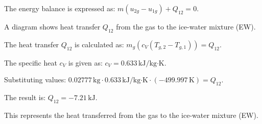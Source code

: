 The energy balance is expressed as:  
\( m (u_{2g} - u_{1g}) + Q_{12} = 0 \).  

A diagram shows heat transfer \( Q_{12} \) from the gas to the ice-water mixture (EW).  

The heat transfer \( Q_{12} \) is calculated as:  
\( m_g (c_V (T_{g,2} - T_{g,1})) = Q_{12} \).  

The specific heat \( c_V \) is given as:  
\( c_V = 0.633 \, \text{kJ/kg·K} \).  

Substituting values:  
\( 0.02777 \, \text{kg} \cdot 0.633 \, \text{kJ/kg·K} \cdot (-499.997 \, \text{K}) = Q_{12} \).  

The result is:  
\( Q_{12} = -7.21 \, \text{kJ} \).  

This represents the heat transferred from the gas to the ice-water mixture (EW).